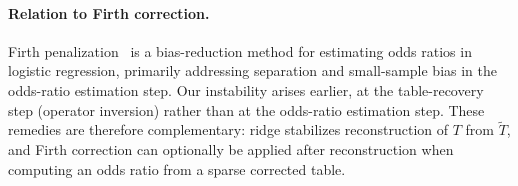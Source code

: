 \documentclass[pdflatex,sn-mathphys-num]{sn-jnl}%
\def\EQSP{3pt}
\newcommand{\cgather}[2][\EQSP]{\begingroup\setlength\abovedisplayskip{#1}\setlength\belowdisplayskip{#1}\begin{gather} #2 \end{gather}\endgroup\noindent}
\newcommand{\SPOR}{\textrm{$\lambda$-OR}}
\newcommand{\logor}{\log\SPOR}
\theoremstyle{thmstyleone}%
\theoremstyle{thmstyletwo}%
\theoremstyle{thmstylethree}%
\begin{document}
\paragraph{Relation to Firth correction.}
Firth penalization~\cite{firth1993bias} is a bias-reduction method for estimating odds ratios in logistic regression, primarily addressing separation and small-sample bias in the odds-ratio estimation step. Our instability arises earlier, at the table-recovery step (operator inversion) rather than at the odds-ratio estimation step. These remedies are therefore complementary: ridge stabilizes reconstruction of $T$ from $\tilde T$, and Firth correction can optionally be applied after reconstruction when computing an odds ratio from a sparse corrected table.











































\end{document}
